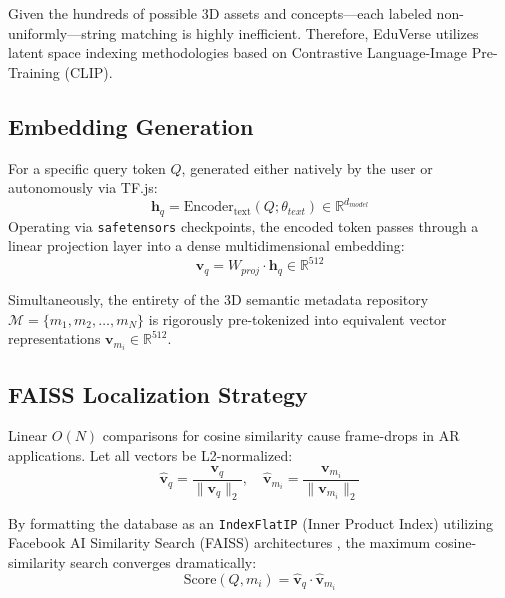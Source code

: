 \documentclass[conference]{IEEEtran}
\begin{document}
Given the hundreds of possible 3D assets and concepts—each labeled non-uniformly—string matching is highly inefficient. Therefore, EduVerse utilizes latent space indexing methodologies based on Contrastive Language-Image Pre-Training (CLIP).

\subsection{Embedding Generation}

For a specific query token $Q$, generated either natively by the user or autonomously via TF.js:
\begin{equation}
\mathbf{h}_q = \text{Encoder}_{\text{text}}(Q; \theta_{text}) \in \mathbb{R}^{d_{model}}
\end{equation}
Operating via \texttt{safetensors} checkpoints, the encoded token passes through a linear projection layer into a dense multidimensional embedding:
\begin{equation}
\mathbf{v}_q = W_{proj} \cdot \mathbf{h}_q \in \mathbb{R}^{512}
\end{equation}

Simultaneously, the entirety of the 3D semantic metadata repository $\mathcal{M} = \{m_1, m_2, \ldots, m_N\}$ is rigorously pre-tokenized into equivalent vector representations $\mathbf{v}_{m_i} \in \mathbb{R}^{512}$.

\subsection{FAISS Localization Strategy}

Linear $O(N)$ comparisons for cosine similarity cause frame-drops in AR applications. Let all vectors be L2-normalized:
\begin{equation}
\hat{\mathbf{v}}_q = \frac{\mathbf{v}_q}{\|\mathbf{v}_q\|_2}, \quad \hat{\mathbf{v}}_{m_i} = \frac{\mathbf{v}_{m_i}}{\|\mathbf{v}_{m_i}\|_2}
\end{equation}

By formatting the database as an \texttt{IndexFlatIP} (Inner Product Index) utilizing Facebook AI Similarity Search (FAISS) architectures \cite{johnson2021faiss}, the maximum cosine-similarity search converges dramatically:
\begin{equation}
\text{Score}(Q, m_i) = \hat{\mathbf{v}}_q \cdot \hat{\mathbf{v}}_{m_i}
\end{equation}
\end{document}
